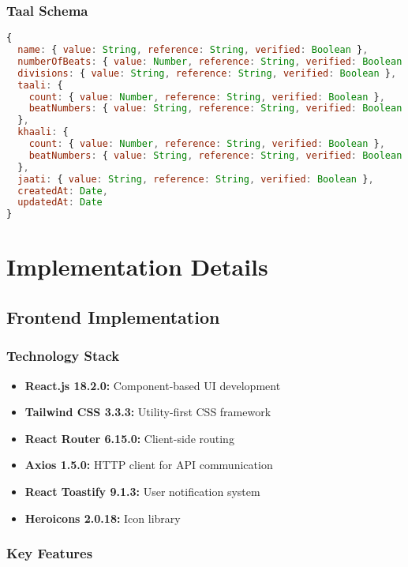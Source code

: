 \documentclass[12pt,a4paper]{article}
\begin{document}
\subsubsection{Taal Schema}
\begin{lstlisting}[language=JavaScript]
{
  name: { value: String, reference: String, verified: Boolean },
  numberOfBeats: { value: Number, reference: String, verified: Boolean },
  divisions: { value: String, reference: String, verified: Boolean },
  taali: {
    count: { value: Number, reference: String, verified: Boolean },
    beatNumbers: { value: String, reference: String, verified: Boolean }
  },
  khaali: {
    count: { value: Number, reference: String, verified: Boolean },
    beatNumbers: { value: String, reference: String, verified: Boolean }
  },
  jaati: { value: String, reference: String, verified: Boolean },
  createdAt: Date,
  updatedAt: Date
}
\end{lstlisting}

\section{Implementation Details}

\subsection{Frontend Implementation}

\subsubsection{Technology Stack}
\begin{itemize}
    \item \textbf{React.js 18.2.0:} Component-based UI development
    \item \textbf{Tailwind CSS 3.3.3:} Utility-first CSS framework
    \item \textbf{React Router 6.15.0:} Client-side routing
    \item \textbf{Axios 1.5.0:} HTTP client for API communication
    \item \textbf{React Toastify 9.1.3:} User notification system
    \item \textbf{Heroicons 2.0.18:} Icon library
\end{itemize}

\subsubsection{Key Features}
\end{document}

